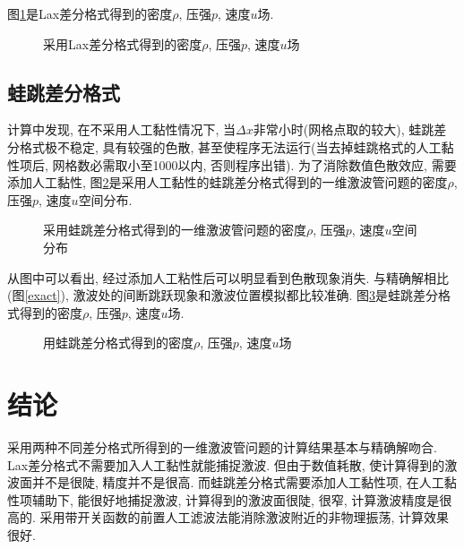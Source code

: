 \documentclass[a4paper,boxed]{caspset}
\begin{document}
图\ref{laxanimate}是Lax差分格式得到的密度$\rho$, 压强$p$, 速度$u$场.
\begin{figure}[!htb]
\centering
{}
\caption{\label{laxanimate}采用Lax差分格式得到的密度$\rho$, 压强$p$, 速度$u$场}
\end{figure}

\subsection{蛙跳差分格式}
计算中发现, 在不采用人工黏性情况下, 当$\Delta x$非常小时(网格点取的较大), 蛙跳差分格式极不稳定, 具有较强的色散, 甚至使程序无法运行(当去掉蛙跳格式的人工黏性项后, 网格数必需取小至1000以内, 否则程序出错). 为了消除数值色散效应, 需要添加人工黏性, 图\ref{leapline}是采用人工黏性的蛙跳差分格式得到的一维激波管问题的密度$\rho$, 压强$p$, 速度$u$空间分布.
\begin{figure}[!htb]
\centering

\caption{\label{leapline}采用蛙跳差分格式得到的一维激波管问题的密度$\rho$, 压强$p$, 速度$u$空间分布}
\end{figure}
从图中可以看出,
经过添加人工粘性后可以明显看到色散现象消失. 与精确解相比(图\ref{exact}), 激波处的间断跳跃现象和激波位置模拟都比较准确.
图\ref{leapanimate}是蛙跳差分格式得到的密度$\rho$, 压强$p$, 速度$u$场.
\begin{figure}[!htb]
\centering
{}
\caption{\label{leapanimate}用蛙跳差分格式得到的密度$\rho$, 压强$p$, 速度$u$场}
\end{figure}

\newpage

\section{结论}
采用两种不同差分格式所得到的一维激波管问题的计算结果基本与精确解吻合.
Lax差分格式不需要加入人工黏性就能捕捉激波. 但由于数值耗散, 使计算得到的激波面并不是很陡, 精度并不是很高. 而蛙跳差分格式需要添加人工黏性项, 在人工黏性项辅助下, 能很好地捕捉激波, 计算得到的激波面很陡, 很窄, 计算激波精度是很高的. 采用带开关函数的前置人工滤波法能消除激波附近的非物理振荡, 计算效果很好.
\end{document}
